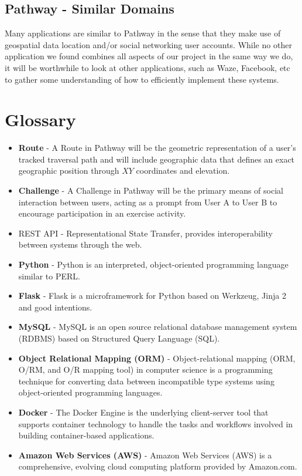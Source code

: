 \documentclass{article}
\begin{document}
\subsection{Pathway - Similar Domains}
Many applications are similar to Pathway in the sense that they make use of geospatial data location and/or social networking user accounts. While no other application we found combines all aspects of our project in the same way we do, it will be worthwhile to look at other applications, such as Waze, Facebook, etc to gather some understanding of how to efficiently implement these systems.

\section{Glossary}
\begin{itemize}
    \item \textbf{Route} - A Route in Pathway will be the geometric representation of a user’s tracked traversal path and will include geographic data that defines an exact geographic position through $XY$ coordinates and elevation.
    \item \textbf{Challenge} - A Challenge in Pathway will be the primary means of social interaction between users, acting as a prompt from User A to User B to encourage participation in an exercise activity.
    \item REST API - Representational State Transfer, provides interoperability between systems through the web.
    \item \textbf{Python} - Python is an interpreted, object-oriented programming language similar to PERL.
    \item \textbf{Flask} - Flask is a microframework for Python based on Werkzeug, Jinja 2 and good intentions.
    \item \textbf{MySQL} - MySQL is an open source relational database management system (RDBMS) based on Structured Query Language (SQL).
    \item \textbf{Object Relational Mapping (ORM)} - Object-relational mapping (ORM, O/RM, and O/R mapping tool) in computer science is a programming technique for converting data between incompatible type systems using object-oriented programming languages.
    \item \textbf{Docker} - The Docker Engine is the underlying client-server tool that supports container technology to handle the tasks and workflows involved in building container-based applications.
    \item \textbf{Amazon Web Services (AWS)} - Amazon Web Services (AWS) is a comprehensive, evolving cloud computing platform provided by Amazon.com.

\end{itemize}
\end{document}
